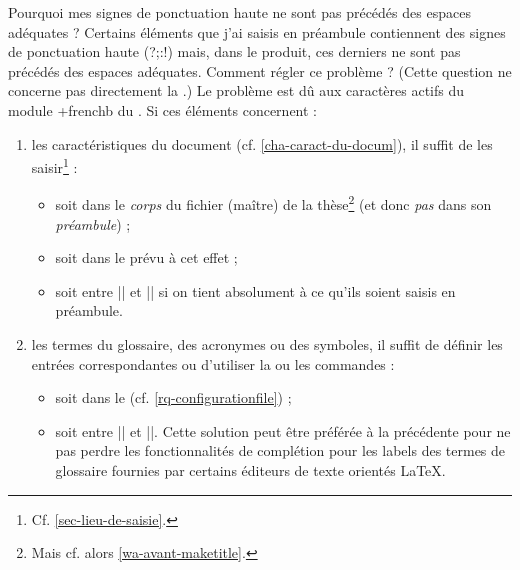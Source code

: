 \begin{dbfaq}{Pourquoi mes signes de ponctuation haute ne sont pas précédés des
    espaces adéquates ?}{}
  Certains éléments que j'ai saisis en préambule contiennent des signes de
  ponctuation haute ({\NoAutoSpacing?;:!}) mais, dans le \pdf{} produit, ces
  derniers ne sont pas précédés des espaces adéquates. Comment régler ce
  problème ?
  \tcblower
  (Cette question ne concerne pas directement la \yatCl{}.) Le problème est dû
  aux caractères actifs du module \package*+{frenchb} du . Si ces
  éléments concernent :
  \begin{enumerate}
  \item les caractéristiques du document (cf. \vref{cha-caract-du-docum}), il
    suffit de les saisir\footnote{Cf. \vref{sec-lieu-de-saisie}.} :
    \begin{itemize}
    \item soit dans le \emph{corps} du fichier (maître) de la
      thèse\footnote{Mais cf. alors \vref{wa-avant-maketitle}.} (et donc
      \emph{pas} dans son \emph{préambule}) ;
    \item soit dans le \File{\characteristicsfile} prévu à cet effet ;
    \item soit entre || et || si on tient
      absolument à ce qu'ils soient saisis en préambule.
    \end{itemize}
  \item les termes du glossaire, des acronymes ou des symboles, il suffit de
    définir les entrées correspondantes ou d'utiliser la ou les commandes
     :
    \begin{itemize}
    \item soit dans le \File{\configurationfile}
      (cf. \vref{rq-configurationfile}) ;
    \item soit entre || et ||. Cette
      solution peut être préférée à la précédente pour ne pas perdre les
      fonctionnalités de complétion pour les labels des termes de glossaire
      fournies par certains éditeurs de texte orientés \LaTeX{}.
    \end{itemize}
  \end{enumerate}
\end{dbfaq}

